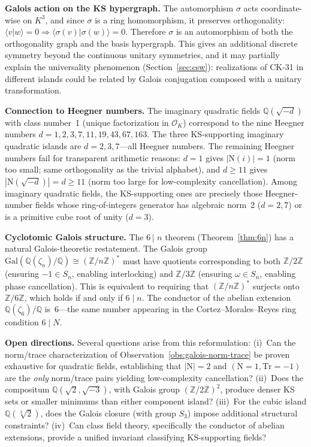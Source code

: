 \documentclass[12pt,a4paper]{article}
\newcommand{\Z}{\mathbb{Z}}
\newcommand{\Q}{\mathbb{Q}}
\begin{document}
\smallskip\noindent\textbf{Galois action on the KS hypergraph.}  The automorphism $\sigma$ acts coordinate-wise on $K^3$, and since $\sigma$ is a ring homomorphism, it preserves orthogonality: $\langle v | w \rangle = 0 \Rightarrow \langle \sigma(v) | \sigma(w) \rangle = 0$.  Therefore $\sigma$ is an automorphism of both the orthogonality graph and the basis hypergraph.  This gives an additional discrete symmetry beyond the continuous unitary symmetries, and it may partially explain the universality phenomenon (Section~\ref{sec:csw}): realizations of CK-31 in different islands could be related by Galois conjugation composed with a unitary transformation.

\smallskip\noindent\textbf{Connection to Heegner numbers.}  The imaginary quadratic fields $\Q(\sqrt{-d})$ with class number~1 (unique factorization in $\mathcal{O}_K$) correspond to the nine Heegner numbers $d = 1, 2, 3, 7, 11, 19, 43, 67, 163$.  The three KS-supporting imaginary quadratic islands are $d = 2, 3, 7$---all Heegner numbers.  The remaining Heegner numbers fail for transparent arithmetic reasons: $d = 1$ gives $|\mathrm{N}(i)| = 1$ (norm too small; same orthogonality as the trivial alphabet), and $d \geq 11$ gives $|\mathrm{N}(\sqrt{-d})| = d \geq 11$ (norm too large for low-complexity cancellation).  Among imaginary quadratic fields, the KS-supporting ones are precisely those Heegner-number fields whose ring-of-integers generator has algebraic norm~2 ($d = 2, 7$) or is a primitive cube root of unity ($d = 3$).

\smallskip\noindent\textbf{Cyclotomic Galois structure.}  The 6\,$|\,$\,$n$ theorem (Theorem~\ref{thm:6n}) has a natural Galois-theoretic restatement.  The Galois group $\mathrm{Gal}(\Q(\zeta_n)/\Q) \cong (\Z/n\Z)^*$ must have quotients corresponding to both $\Z/2\Z$ (ensuring $-1 \in S_n$, enabling interlocking) and $\Z/3\Z$ (ensuring $\omega \in S_n$, enabling phase cancellation).  This is equivalent to requiring that $(\Z/n\Z)^*$ surjects onto $\Z/6\Z$, which holds if and only if $6 \mid n$.  The conductor of the abelian extension $\Q(\zeta_6)/\Q$ is~6---the same number appearing in the Cortez--Morales--Reyes ring condition $6 \mid N$.

\smallskip\noindent\textbf{Open directions.}  Several questions arise from this reformulation: (i)~Can the norm/trace characterization of Observation~\ref{obs:galois-norm-trace} be proven exhaustive for quadratic fields, establishing that $|\mathrm{N}| = 2$ and $(\mathrm{N} = 1, \mathrm{Tr} = -1)$ are the \emph{only} norm/trace pairs yielding low-complexity cancellation? (ii)~Does the compositum $\Q(\sqrt{2}, \sqrt{-3})$, with Galois group $(\Z/2\Z)^2$, produce denser KS sets or smaller minimums than either component island? (iii)~For the cubic island $\Q(\sqrt[3]{2})$, does the Galois closure (with group $S_3$) impose additional structural constraints? (iv)~Can class field theory, specifically the conductor of abelian extensions, provide a unified invariant classifying KS-supporting fields?
\end{document}
